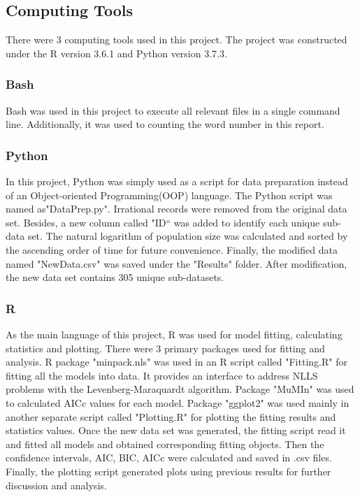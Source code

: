 \subsection{Computing Tools}
There were 3 computing tools used in this project. The project was constructed under the R version 3.6.1 and Python version 3.7.3.

\subsubsection{Bash}
Bash was used in this project to execute all relevant files in a single command line. Additionally, it was used to counting the word number in this report.
\subsubsection{Python}
In this project, Python was simply used as a script for data preparation instead of an Object-oriented Programming(OOP) language. The Python script was named as"DataPrep.py". Irrational records were removed from the original data set. Besides, a new column called "ID“ was added to identify each unique sub-data set. The natural logarithm of population size was calculated and sorted by the ascending order of time for future convenience. Finally, the modified data named "NewData.csv" was saved under the "Results" folder. After modification, the new data set contains 305 unique sub-datasets.
\subsubsection{R}
As the main language of this project, R was used for model fitting, calculating statistics and plotting. There were 3 primary packages used for fitting and analysis. R package "minpack.nls" was used in an R script called "Fitting.R" for fitting all the models into data. It provides an interface to address NLLS problems with the Levenberg-Maraquardt algorithm. Package "MuMIn" was used to calculated AICc values for each model. Package "ggplot2" was used mainly in another separate script called "Plotting.R" for plotting the fitting results and statistics values. Once the new data set was generated, the fitting script read it and fitted all models and obtained corresponding fitting objects. Then the confidence intervals, AIC, BIC, AICc were calculated and saved in .csv files. Finally, the plotting script generated plots using previous results for further discussion and analysis.







